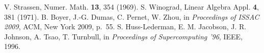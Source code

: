  V. Strassen, Numer. Math. \textbf{13}, 354 (1969).
 S. Winograd, Linear Algebra Appl. \textbf{4}, 381 (1971).
 B. Boyer, J.-G. Dumas, C. Pernet, W. Zhou, in \emph{Proceedings of ISSAC 2009}, ACM, New York 2009, p.~55.
 S. Huss-Lederman, E. M. Jacobson, J. R. Johnson, A. Tsao, T. Turnbull, in \emph{Proceedings of Supercomputing '96}, IEEE, 1996.
